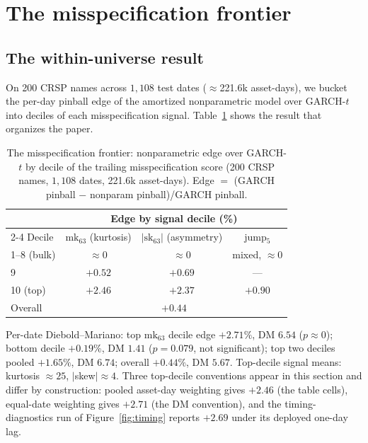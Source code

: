 \documentclass[11pt]{article}
\theoremstyle{remark}
\begin{document}
\section{The misspecification frontier}\label{sec:frontier}

\subsection{The within-universe result}

On 200 CRSP names across $1{,}108$ test dates ($\approx$221.6k asset-days), we bucket the per-day
pinball edge of the amortized nonparametric model over GARCH-$t$ into
deciles of each misspecification signal.
Table~\ref{tab:frontier} shows the result that organizes the paper.

\begin{table}[t]
\centering
\begin{threeparttable}
\caption{The misspecification frontier: nonparametric edge over
GARCH-$t$ by decile of the trailing misspecification score (200 CRSP
names, $1{,}108$ dates, 221.6k asset-days). Edge $=$ (GARCH pinball $-$ nonparam
pinball)/GARCH pinball.}
\label{tab:frontier}
\begin{tabular}{lccc}
\toprule
& \multicolumn{3}{c}{Edge by signal decile (\%)} \\
\cmidrule(lr){2-4}
Decile & $\mathrm{mk}_{63}$ (kurtosis) & $|\mathrm{sk}_{63}|$ (asymmetry) & jump$_5$ \\
\midrule
1--8 (bulk) & $\approx 0$ & $\approx 0$ & mixed, $\approx 0$ \\
9 & $+0.52$ & $+0.69$ & --- \\
10 (top) & $\mathbf{+2.46}$ & $\mathbf{+2.37}$ & $+0.90$ \\
\midrule
Overall & \multicolumn{3}{c}{$+0.44$} \\
\bottomrule
\end{tabular}
\begin{tablenotes}\footnotesize
\item Per-date Diebold--Mariano: top $\mathrm{mk}_{63}$ decile edge
$+2.71\%$, DM $6.54$ ($p \approx 0$); bottom decile $+0.19\%$, DM $1.41$
($p = 0.079$, not significant); top two deciles pooled $+1.65\%$, DM
$6.74$; overall $+0.44\%$, DM $5.67$. Top-decile signal means: kurtosis
$\approx 25$, $|$skew$| \approx 4$. Three top-decile conventions
appear in this section and differ by construction: pooled asset-day
weighting gives $+2.46$ (the table cells), equal-date weighting gives
$+2.71$ (the DM convention), and the timing-diagnostics run of
Figure~\ref{fig:timing} reports $+2.69$ under its deployed one-day
lag.
\end{tablenotes}
\end{threeparttable}
\end{table}
\end{document}
